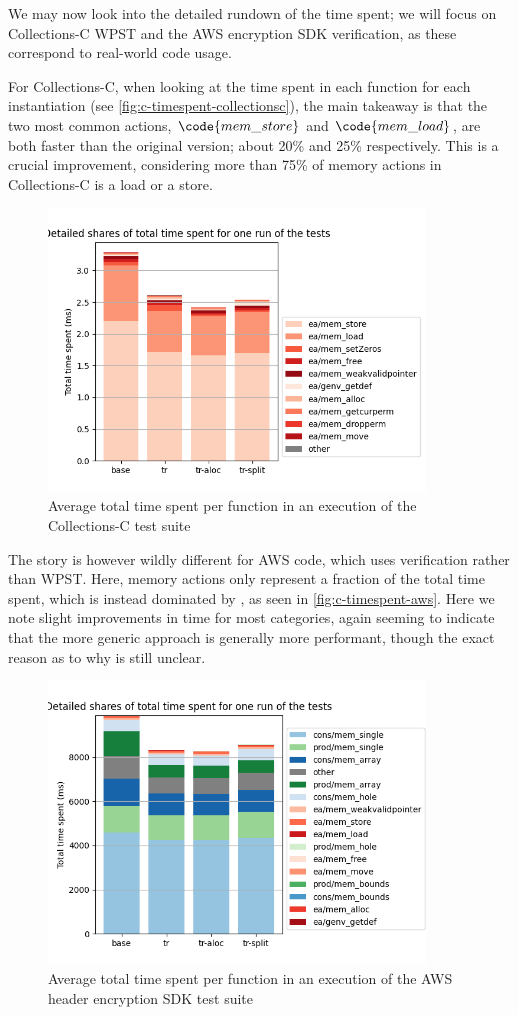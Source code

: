We may now look into the detailed rundown of the time spent; we will focus on Collections-C WPST and the AWS encryption SDK verification, as these correspond to real-world code usage.

For Collections-C, when looking at the time spent in each function for each instantiation (see \autoref{fig:c-timespent-collectionsc}), the main takeaway is that the two most common actions, $\code{mem\_store}$ and $\code{mem\_load}$, are both faster than the original version; about 20\% and 25\% respectively. This is a crucial improvement, considering more than 75\% of memory actions in Collections-C is a load or a store.

\begin{figure}
	\centering
	\includegraphics[width=10cm]{figures/c-timespent-collectionsc.png}
	\caption{Average total time spent per function in an execution of the Collections-C test suite}
	\label{fig:c-timespent-collectionsc}
\end{figure}

The story is however wildly different for AWS code, which uses verification rather than WPST. Here, memory actions only represent a fraction of the total time spent, which is instead dominated by \consume, as seen in \autoref{fig:c-timespent-aws}. Here we note slight improvements in time for most categories, again seeming to indicate that the more generic approach is generally more performant, though the exact reason as to why is still unclear.

\begin{figure}
	\centering
	\includegraphics[width=10cm]{figures/c-timespent-aws.png}
	\caption{Average total time spent per function in an execution of the AWS header encryption SDK test suite}
	\label{fig:c-timespent-aws}
\end{figure}

